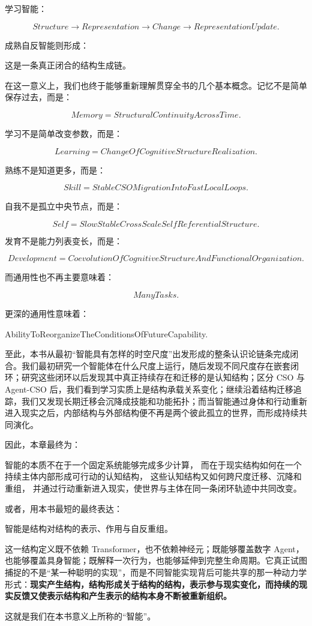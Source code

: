 学习智能：

\[
Structure
\rightarrow
Representation
\rightarrow
Change
\rightarrow
RepresentationUpdate.
\]

成熟自反智能则形成：

\begin{statementbox}
\centering
{}
\end{statementbox}

这是一条真正闭合的结构生成链。

在这一意义上，我们也终于能够重新理解贯穿全书的几个基本概念。记忆不是简单保存过去，而是：

\[
\boxed{
Memory
=
StructuralContinuityAcrossTime.
}
\]

学习不是简单改变参数，而是：

\[
\boxed{
Learning
=
ChangeOfCognitiveStructureRealization.
}
\]

熟练不是知道更多，而是：

\[
\boxed{
Skill
=
StableCSOMigrationIntoFastLocalLoops.
}
\]

自我不是孤立中央节点，而是：

\[
\boxed{
Self
=
SlowStableCrossScaleSelfReferentialStructure.
}
\]

发育不是能力列表变长，而是：

\[
\boxed{
Development
=
CoevolutionOfCognitiveStructureAndFunctionalOrganization.
}
\]

而通用性也不再主要意味着：

\[
ManyTasks.
\]

更深的通用性意味着：

\begin{statementbox}
AbilityToReorganizeTheConditionsOfFutureCapability.
\end{statementbox}

至此，本书从最初“智能具有怎样的时空尺度”出发形成的整条认识论链条完成闭合。我们最初研究一个智能体在什么尺度上运行，随后发现不同尺度存在嵌套闭环；研究这些闭环以后发现其中真正持续存在和迁移的是认知结构；区分 CSO 与 Agent-CSO 后，我们看到学习实质上是结构承载关系变化；继续沿着结构迁移追踪，我们又发现长期迁移会沉降成技能和功能拓扑；而当智能通过身体和行动重新进入现实之后，内部结构与外部结构便不再是两个彼此孤立的世界，而形成持续共同演化。

因此，本章最终为：

\begin{statementbox}
智能的本质不在于一个固定系统能够完成多少计算，
而在于现实结构如何在一个持续主体内部形成可行动的认知结构，
这些认知结构又如何跨尺度迁移、沉降和重组，
并通过行动重新进入现实，使世界与主体在同一条闭环轨迹中共同改变。
\end{statementbox}

或者，用本书最短的最终表达：

\begin{statementbox}
智能是结构对结构的表示、作用与自反重组。
\end{statementbox}

这一结构定义既不依赖 Transformer，也不依赖神经元；既能够覆盖数字 Agent，也能够覆盖具身智能；既解释一次行为，也能够延伸到完整生命周期。它真正试图捕捉的不是“某一种聪明的实现”，而是不同智能实现背后可能共享的那一种动力学形式：\textbf{现实产生结构，结构形成关于结构的结构，表示参与现实变化，而持续的现实反馈又使表示结构和产生表示的结构本身不断被重新组织。}

这就是我们在本书意义上所称的“智能”。
